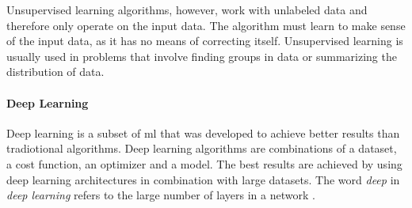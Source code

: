 Unsupervised learning algorithms, however, work with unlabeled data and therefore only operate on the input data.
The algorithm must learn to make sense of the input data, as it has no means of correcting itself.
Unsupervised learning is usually used in problems that involve finding groups in data or summarizing the distribution of data.

\paragraph{Deep Learning}
Deep learning is a subset of \acrlong{ml} that was developed to achieve better results than tradiotional algorithms.
Deep learning algorithms are combinations of a dataset, a cost function, an optimizer and a model.
The best results are achieved by using deep learning architectures in combination with large datasets.
The word \textit{deep} in \textit{deep learning} refers to the large number of layers in a network \cite[p.~151--152]{deeplearningbook}.









